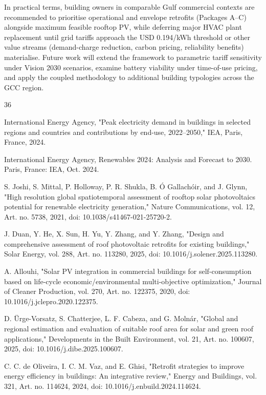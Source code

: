 \documentclass[journal,fleqn]{IEEEtran}
\begin{document}
In practical terms, building owners in comparable Gulf commercial contexts are recommended to prioritise operational and envelope retrofits (Packages A--C) alongside maximum feasible rooftop PV, while deferring major HVAC plant replacement until grid tariffs approach the USD 0.194/kWh threshold or other value streams (demand-charge reduction, carbon pricing, reliability benefits) materialise. Future work will extend the framework to parametric tariff sensitivity under Vision 2030 scenarios, examine battery viability under time-of-use pricing, and apply the coupled methodology to additional building typologies across the GCC region.


\begin{thebibliography}{36}

 International Energy Agency, "Peak electricity demand in buildings in selected regions and countries and contributions by end-use, 2022--2050," IEA, Paris, France, 2024.

 International Energy Agency, Renewables 2024: Analysis and Forecast to 2030. Paris, France: IEA, Oct. 2024.

 S. Joshi, S. Mittal, P. Holloway, P. R. Shukla, B. Ó Gallachóir, and J. Glynn, "High resolution global spatiotemporal assessment of rooftop solar photovoltaics potential for renewable electricity generation," Nature Communications, vol. 12, Art. no. 5738, 2021, doi: 10.1038/s41467-021-25720-2.

 J. Duan, Y. He, X. Sun, H. Yu, Y. Zhang, and Y. Zhang, "Design and comprehensive assessment of roof photovoltaic retrofits for existing buildings," Solar Energy, vol. 288, Art. no. 113280, 2025, doi: 10.1016/j.solener.2025.113280.

 A. Allouhi, "Solar PV integration in commercial buildings for self-consumption based on life-cycle economic/environmental multi-objective optimization," Journal of Cleaner Production, vol. 270, Art. no. 122375, 2020, doi: 10.1016/j.jclepro.2020.122375.

 D. Ürge-Vorsatz, S. Chatterjee, L. F. Cabeza, and G. Molnár, "Global and regional estimation and evaluation of suitable roof area for solar and green roof applications," Developments in the Built Environment, vol. 21, Art. no. 100607, 2025, doi: 10.1016/j.dibe.2025.100607.

 C. C. de Oliveira, I. C. M. Vaz, and E. Ghisi, "Retrofit strategies to improve energy efficiency in buildings: An integrative review," Energy and Buildings, vol. 321, Art. no. 114624, 2024, doi: 10.1016/j.enbuild.2024.114624.


\end{thebibliography}
\end{document}
